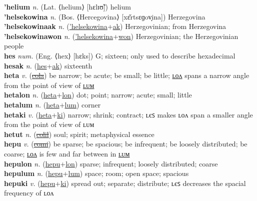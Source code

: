 \textbf{'helium} \textit{n.} (Lat. ⟨helium⟩ [hɛlɪʊ̃])
helium \label{'helium} \\
\textbf{'helsekowina} \textit{n.} (Bos. ⟨Hercegovina⟩ [xɛ̌rtsɛɡov̞ina])
Herzegovina \label{'helsekowina} \\
\textbf{'helsekowinaak} \textit{n.} (\hyperref['helsekowina]{'helsekowina}+\hyperref[ak]{ak})
Herzegovinian; from Herzegovina \label{'helsekowinaak} \\
\textbf{'helsekowinawon} \textit{n.} (\hyperref['helsekowina]{'helsekowina}+\hyperref[won]{won})
Herzegovinian; the Herzegovinian people \label{'helsekowinawon} \\
\textbf{hes} \textit{num.} (Eng. ⟨hex⟩ [hɛks])
G; sixteen; only used to describe hexadecimal \label{hes} \\
\textbf{hesak} \textit{n.} (\hyperref[hes]{hes}+\hyperref[ak]{ak})
sixteenth \label{hesak} \\
\textbf{heta} \textit{v.} (\hyperref[cola]{\sout{cola}})
be narrow; be acute; be small; be little; \hyperref[hetalon]{ʟᴏᴧ} spans a narrow angle from the point of view of \hyperref[hetalum]{ʟᴜᴍ} \label{heta} \\
\textbf{hetalon} \textit{n.} (\hyperref[heta]{heta}+\hyperref[lon]{lon})
dot; point; narrow; acute; small; little \label{hetalon} \\
\textbf{hetalum} \textit{n.} (\hyperref[heta]{heta}+\hyperref[lum]{lum})
corner \label{hetalum} \\
\textbf{hetaki} \textit{v.} (\hyperref[heta]{heta}+\hyperref[ki]{ki})
narrow; shrink; contract; ʟєꜱ makes ʟᴏᴧ span a smaller angle from the point of view of ʟᴜᴍ \label{hetaki} \\
\textbf{hetut} \textit{n.} (\hyperref[colil]{\sout{colil}})
soul; spirit; metaphysical essence \label{hetut} \\
\textbf{hepu} \textit{v.} (\hyperref[comi]{\sout{comi}})
be sparse; be spacious; be infrequent; be loosely distributed; be coarse; \hyperref[hepulon]{ʟᴏᴧ} is few and far between in \hyperref[hepulum]{ʟᴜᴍ} \label{hepu} \\
\textbf{hepulon} \textit{n.} (\hyperref[hepu]{hepu}+\hyperref[lon]{lon})
sparse; infrequent; loosely distributed; coarse \label{hepulon} \\
\textbf{hepulum} \textit{n.} (\hyperref[hepu]{hepu}+\hyperref[lum]{lum})
space; room; open space; spacious \label{hepulum} \\
\textbf{hepuki} \textit{v.} (\hyperref[hepu]{hepu}+\hyperref[ki]{ki})
spread out; separate; distribute; ʟєꜱ decreases the spacial frequency of ʟᴏᴧ \label{hepuki} \\

